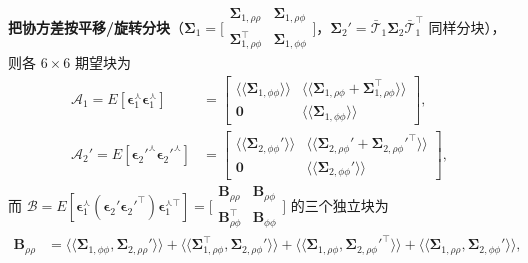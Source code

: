 \begin{derivation}
\textbf{把协方差按平移/旋转分块}（$\boldsymbol{\Sigma}_1=\big[\begin{smallmatrix}\boldsymbol{\Sigma}_{1,\rho\rho}&\boldsymbol{\Sigma}_{1,\rho\phi}\\\boldsymbol{\Sigma}_{1,\rho\phi}^\top&\boldsymbol{\Sigma}_{1,\phi\phi}\end{smallmatrix}\big]$，$\boldsymbol{\Sigma}_2'=\bar{\boldsymbol{\mathcal{T}}}_1\boldsymbol{\Sigma}_2\bar{\boldsymbol{\mathcal{T}}}_1^\top$ 同样分块），则各 $6\times6$ 期望块为
\begin{align}
  \boldsymbol{\mathcal{A}}_1=E[\boldsymbol{\epsilon}_1^\curlywedge\boldsymbol{\epsilon}_1^\curlywedge]
  &=\begin{bmatrix}\langle\!\langle\boldsymbol{\Sigma}_{1,\phi\phi}\rangle\!\rangle & \langle\!\langle\boldsymbol{\Sigma}_{1,\rho\phi}+\boldsymbol{\Sigma}_{1,\rho\phi}^\top\rangle\!\rangle\\ \mathbf{0} & \langle\!\langle\boldsymbol{\Sigma}_{1,\phi\phi}\rangle\!\rangle\end{bmatrix},
  \label{eq:fourth-A1}\\
  \boldsymbol{\mathcal{A}}_2'=E[\boldsymbol{\epsilon}_2'^\curlywedge\boldsymbol{\epsilon}_2'^\curlywedge]
  &=\begin{bmatrix}\langle\!\langle\boldsymbol{\Sigma}_{2,\phi\phi}'\rangle\!\rangle & \langle\!\langle\boldsymbol{\Sigma}_{2,\rho\phi}'+\boldsymbol{\Sigma}_{2,\rho\phi}'^\top\rangle\!\rangle\\ \mathbf{0} & \langle\!\langle\boldsymbol{\Sigma}_{2,\phi\phi}'\rangle\!\rangle\end{bmatrix},
  \label{eq:fourth-A2}
\end{align}
而 $\boldsymbol{\mathcal{B}}=E[\boldsymbol{\epsilon}_1^\curlywedge(\boldsymbol{\epsilon}_2'\boldsymbol{\epsilon}_2'^\top)\boldsymbol{\epsilon}_1^{\curlywedge\top}]=\big[\begin{smallmatrix}\mathbf{B}_{\rho\rho}&\mathbf{B}_{\rho\phi}\\\mathbf{B}_{\rho\phi}^\top&\mathbf{B}_{\phi\phi}\end{smallmatrix}\big]$ 的三个独立块为
\begin{align}
  \mathbf{B}_{\rho\rho}&=\langle\!\langle\boldsymbol{\Sigma}_{1,\phi\phi},\boldsymbol{\Sigma}_{2,\rho\rho}'\rangle\!\rangle+\langle\!\langle\boldsymbol{\Sigma}_{1,\rho\phi}^\top,\boldsymbol{\Sigma}_{2,\rho\phi}'\rangle\!\rangle
   +\langle\!\langle\boldsymbol{\Sigma}_{1,\rho\phi},\boldsymbol{\Sigma}_{2,\rho\phi}'^\top\rangle\!\rangle+\langle\!\langle\boldsymbol{\Sigma}_{1,\rho\rho},\boldsymbol{\Sigma}_{2,\phi\phi}'\rangle\!\rangle,

\end{align}
\end{derivation}
